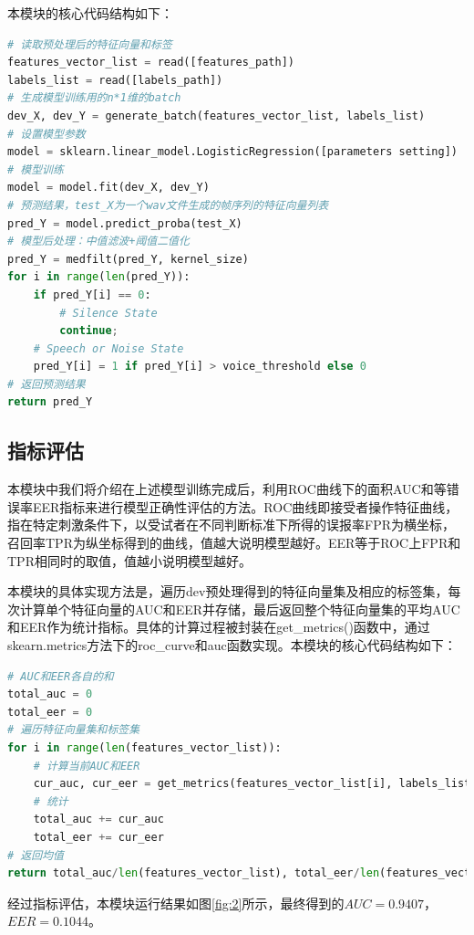 \documentclass[a4paper]{article}
\begin{document}
本模块的核心代码结构如下：

\begin{lstlisting}[language=python]
# 读取预处理后的特征向量和标签
features_vector_list = read([features_path])
labels_list = read([labels_path])
# 生成模型训练用的n*1维的batch
dev_X, dev_Y = generate_batch(features_vector_list, labels_list)
# 设置模型参数
model = sklearn.linear_model.LogisticRegression([parameters setting])
# 模型训练
model = model.fit(dev_X, dev_Y)
# 预测结果，test_X为一个wav文件生成的帧序列的特征向量列表
pred_Y = model.predict_proba(test_X)
# 模型后处理：中值滤波+阈值二值化
pred_Y = medfilt(pred_Y, kernel_size)
for i in range(len(pred_Y)):
    if pred_Y[i] == 0:
        # Silence State
        continue;
    # Speech or Noise State
    pred_Y[i] = 1 if pred_Y[i] > voice_threshold else 0
# 返回预测结果
return pred_Y
\end{lstlisting}

\subsection{指标评估}

本模块中我们将介绍在上述模型训练完成后，利用ROC曲线下的面积AUC和等错误率EER指标来进行模型正确性评估的方法。ROC曲线即接受者操作特征曲线，指在特定刺激条件下，以受试者在不同判断标准下所得的误报率FPR为横坐标，召回率TPR为纵坐标得到的曲线，值越大说明模型越好。EER等于ROC上FPR和TPR相同时的取值，值越小说明模型越好。

本模块的具体实现方法是，遍历dev预处理得到的特征向量集及相应的标签集，每次计算单个特征向量的AUC和EER并存储，最后返回整个特征向量集的平均AUC和EER作为统计指标。具体的计算过程被封装在get\_metrics()函数中，通过skearn.metrics方法下的roc\_curve和auc函数实现。本模块的核心代码结构如下：

\begin{lstlisting}[language=python]
# AUC和EER各自的和
total_auc = 0
total_eer = 0
# 遍历特征向量集和标签集
for i in range(len(features_vector_list)):
    # 计算当前AUC和EER
    cur_auc, cur_eer = get_metrics(features_vector_list[i], labels_list[i])
    # 统计
    total_auc += cur_auc
    total_eer += cur_eer
# 返回均值
return total_auc/len(features_vector_list), total_eer/len(features_vector_list)
\end{lstlisting}

经过指标评估，本模块运行结果如图\ref{fig:2}所示，最终得到的$AUC = 0.9407$，$EER = 0.1044$。
\end{document}
